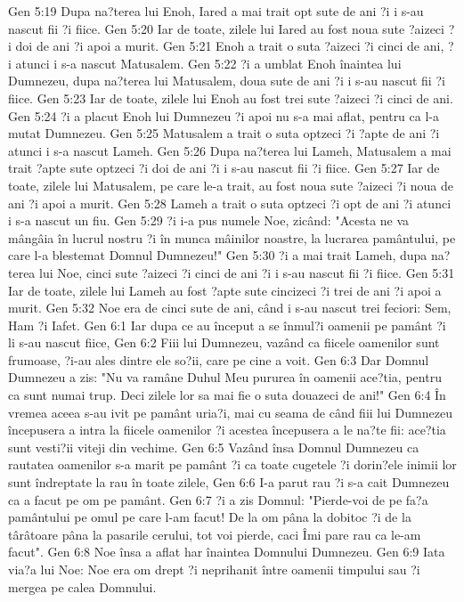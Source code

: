 Gen 5:19  Dupa na?terea lui Enoh, Iared a mai trait opt sute de ani ?i i s-au nascut fii ?i fiice.
Gen 5:20  Iar de toate, zilele lui Iared au fost noua sute ?aizeci ?i doi de ani ?i apoi a murit.
Gen 5:21  Enoh a trait o suta ?aizeci ?i cinci de ani, ?i atunci i s-a nascut Matusalem.
Gen 5:22  ?i a umblat Enoh înaintea lui Dumnezeu, dupa na?terea lui Matusalem, doua sute de ani ?i i s-au nascut fii ?i fiice.
Gen 5:23  Iar de toate, zilele lui Enoh au fost trei sute ?aizeci ?i cinci de ani.
Gen 5:24  ?i a placut Enoh lui Dumnezeu ?i apoi nu s-a mai aflat, pentru ca l-a mutat Dumnezeu.
Gen 5:25  Matusalem a trait o suta optzeci ?i ?apte de ani ?i atunci i s-a nascut Lameh.
Gen 5:26  Dupa na?terea lui Lameh, Matusalem a mai trait ?apte sute optzeci ?i doi de ani ?i i s-au nascut fii ?i fiice.
Gen 5:27  Iar de toate, zilele lui Matusalem, pe care le-a trait, au fost noua sute ?aizeci ?i noua de ani ?i apoi a murit.
Gen 5:28  Lameh a trait o suta optzeci ?i opt de ani ?i atunci i s-a nascut un fiu.
Gen 5:29  ?i i-a pus numele Noe, zicând: "Acesta ne va mângâia în lucrul nostru ?i în munca mâinilor noastre, la lucrarea pamântului, pe care l-a blestemat Domnul Dumnezeu!"
Gen 5:30  ?i a mai trait Lameh, dupa na?terea lui Noe, cinci sute ?aizeci ?i cinci de ani ?i i s-au nascut fii ?i fiice.
Gen 5:31  Iar de toate, zilele lui Lameh au fost ?apte sute cincizeci ?i trei de ani ?i apoi a murit.
Gen 5:32  Noe era de cinci sute de ani, când i s-au nascut trei feciori: Sem, Ham ?i Iafet.
Gen 6:1  Iar dupa ce au început a se înmul?i oamenii pe pamânt ?i li s-au nascut fiice,
Gen 6:2  Fiii lui Dumnezeu, vazând ca fiicele oamenilor sunt frumoase, ?i-au ales dintre ele so?ii, care pe cine a voit.
Gen 6:3  Dar Domnul Dumnezeu a zis: "Nu va ramâne Duhul Meu pururea în oamenii ace?tia, pentru ca sunt numai trup. Deci zilele lor sa mai fie o suta douazeci de ani!"
Gen 6:4  În vremea aceea s-au ivit pe pamânt uria?i, mai cu seama de când fiii lui Dumnezeu începusera a intra la fiicele oamenilor ?i acestea începusera a le na?te fii: ace?tia sunt vesti?ii viteji din vechime.
Gen 6:5  Vazând însa Domnul Dumnezeu ca rautatea oamenilor s-a marit pe pamânt ?i ca toate cugetele ?i dorin?ele inimii lor sunt îndreptate la rau în toate zilele,
Gen 6:6  I-a parut rau ?i s-a cait Dumnezeu ca a facut pe om pe pamânt.
Gen 6:7  ?i a zis Domnul: "Pierde-voi de pe fa?a pamântului pe omul pe care l-am facut! De la om pâna la dobitoc ?i de la târâtoare pâna la pasarile cerului, tot voi pierde, caci Îmi pare rau ca le-am facut".
Gen 6:8  Noe însa a aflat har înaintea Domnului Dumnezeu.
Gen 6:9  Iata via?a lui Noe: Noe era om drept ?i neprihanit între oamenii timpului sau ?i mergea pe calea Domnului.
